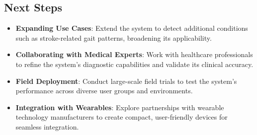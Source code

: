 \subsection{Next Steps}
\begin{itemize}
	\item \textbf{Expanding Use Cases}: Extend the system to detect additional conditions such as stroke-related gait patterns, broadening its applicability.
	\item \textbf{Collaborating with Medical Experts}: Work with healthcare professionals to refine the system’s diagnostic capabilities and validate its clinical accuracy.
	\item \textbf{Field Deployment}: Conduct large-scale field trials to test the system’s performance across diverse user groups and environments.
	\item \textbf{Integration with Wearables}: Explore partnerships with wearable technology manufacturers to create compact, user-friendly devices for seamless integration.
\end{itemize}

